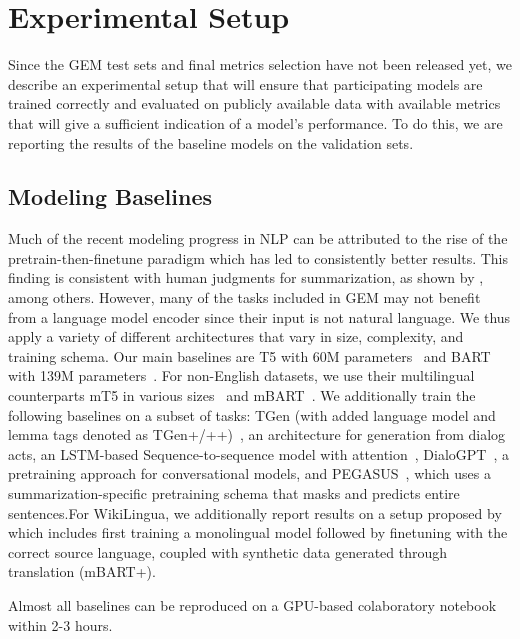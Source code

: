 \documentclass[11pt,a4paper]{article}
\newcommand{\GEM}{\textsc{GEM}}
\begin{document}
\section{Experimental Setup}

Since the \GEM{} test sets and final metrics selection have not been released yet, we describe an experimental setup that will ensure that participating models are trained correctly and evaluated on publicly available data with available metrics that will give a sufficient indication of a model's performance. To do this, we are reporting the results of the baseline models on the validation sets. 


\subsection{Modeling Baselines}

Much of the recent modeling progress in NLP can be attributed to the rise of the pretrain-then-finetune paradigm which has led to consistently better results. This finding is consistent with human judgments for summarization, as shown by \citet{fabbri2020summeval}, among others. 
However, many of the tasks included in \GEM{} may not benefit from a language model encoder since their input is not natural language. We thus apply a variety of different architectures that vary in size, complexity, and training schema. 
Our main baselines are T5 with 60M parameters~\citep{raffel2019exploring} and BART with 139M parameters~\citep{lewis2019bart}. For non-English datasets, we use their multilingual counterparts mT5 in various sizes~\citep{xue2020mt5} and mBART~\citep{liu2020multilingual}. 
We additionally train the following baselines on a subset of tasks: TGen (with added language model and lemma tags denoted as TGen+/++)~\citep{dusek2016sequence}, an architecture for generation from dialog acts, an LSTM-based Sequence-to-sequence model with attention~\citep{bahdanau2014neural}, DialoGPT~\citep{zhang2019dialogpt}, a pretraining approach for conversational models, and PEGASUS~\citep{zhang2020pegasus}, which uses a summarization-specific pretraining schema that masks and predicts entire sentences.For WikiLingua, we additionally report results on a setup proposed by \citet{ladhak2020wikilingua} which includes first training a monolingual model followed by finetuning with the correct source language, coupled with synthetic data generated through translation (mBART+). 

\noindent Almost all baselines can be reproduced on a GPU-based colaboratory notebook within 2-3 hours. 
\end{document}
